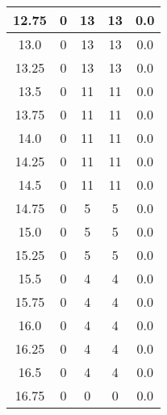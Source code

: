 \documentclass[letterpaper, 12pt]{article}
\begin{document}
\begin{longtable}{|c|c|c|c|c|}
\hline
12.75 & 0 & 13 & 13 & 0.0 \\
\hline
13.0 & 0 & 13 & 13 & 0.0 \\
\hline
13.25 & 0 & 13 & 13 & 0.0 \\
\hline
13.5 & 0 & 11 & 11 & 0.0 \\
\hline
13.75 & 0 & 11 & 11 & 0.0 \\
\hline
14.0 & 0 & 11 & 11 & 0.0 \\
\hline
14.25 & 0 & 11 & 11 & 0.0 \\
\hline
14.5 & 0 & 11 & 11 & 0.0 \\
\hline
14.75 & 0 & 5 & 5 & 0.0 \\
\hline
15.0 & 0 & 5 & 5 & 0.0 \\
\hline
15.25 & 0 & 5 & 5 & 0.0 \\
\hline
15.5 & 0 & 4 & 4 & 0.0 \\
\hline
15.75 & 0 & 4 & 4 & 0.0 \\
\hline
16.0 & 0 & 4 & 4 & 0.0 \\
\hline
16.25 & 0 & 4 & 4 & 0.0 \\
\hline
16.5 & 0 & 4 & 4 & 0.0 \\
\hline
16.75 & 0 & 0 & 0 & 0.0 \\
\hline
\end{longtable}
\end{document}
